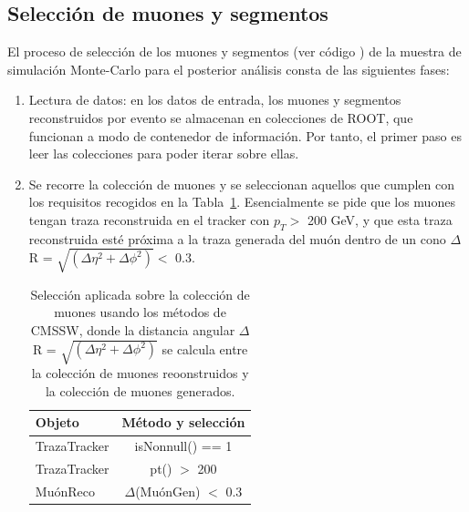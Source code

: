 \subsection{Selecci\'on de muones y segmentos}\label{sec:selection}

El proceso de selecci\'on de los muones y segmentos (ver c\'odigo \cite{analyzer}) de la muestra de simulaci\'on Monte-Carlo para el posterior an\'alisis consta de las siguientes fases: 

\begin{enumerate}
\item Lectura de datos: en los datos de entrada, los muones y segmentos reconstruidos por evento se almacenan en colecciones de ROOT, que funcionan a modo de contenedor de informaci\'on. Por tanto, el primer paso es leer las colecciones para poder iterar sobre ellas. 
\item Se recorre la colecci\'on de muones y se seleccionan aquellos que cumplen con los requisitos recogidos en la Tabla~\ref{tab:muon_sel}. Esencialmente se pide que los muones tengan traza reconstruida en el tracker con $p_{T} >$ 200 GeV, y que esta traza reconstruida est\'e pr\'oxima a la traza generada del mu\'on dentro de un cono $\Delta$R = $\sqrt{(\Delta\eta^{2}+\Delta\phi^{2})} <$  0.3.

\begin{table}[htbp]
  \begin{center}
    {\normalsize
      \begin{tabular} {lc}
        \hline
        \hline
        Objeto                            & M\'etodo y selecci\'on                \\
        \hline
        TrazaTracker                      & isNonnull() == 1                       \\
        TrazaTracker                      & pt() $>$ 200                           \\
        Mu\'onReco                        & $\Delta$(Mu\'onGen) $<$ 0.3            \\
        \hline
      \end{tabular}
    }
    \caption{Selecci\'on aplicada sobre la colecci\'on de muones usando los m\'etodos de CMSSW, donde la distancia angular $\Delta$R = $\sqrt{(\Delta\eta^{2}+\Delta\phi^{2})}$ se calcula entre la colecci\'on de muones reoonstruidos y la colecci\'on de muones generados.}
    \label{tab:muon_sel}
  \end{center}
\end{table}


\end{enumerate}
